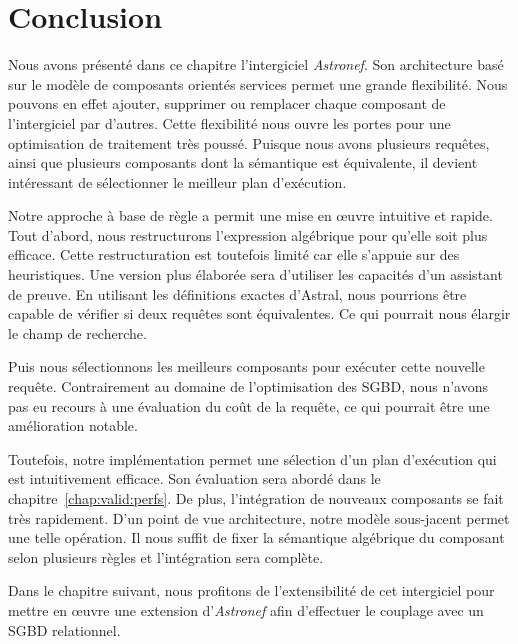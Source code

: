 \section{Conclusion}\label{sec:contrib:astronef:conclusion}
Nous avons présenté dans ce chapitre l'intergiciel \textit{Astronef}. Son architecture basé sur le modèle de composants orientés services permet une grande flexibilité. Nous pouvons en effet ajouter, supprimer ou remplacer chaque composant de l'intergiciel par d'autres. Cette flexibilité nous ouvre les portes pour une optimisation de traitement très poussé. Puisque nous avons plusieurs requêtes, ainsi que plusieurs composants dont la sémantique est équivalente, il devient intéressant de sélectionner le meilleur plan d'exécution.

Notre approche à base de règle a permit une mise en œuvre intuitive et rapide. Tout d'abord, nous restructurons l'expression algébrique pour qu'elle soit plus efficace. Cette restructuration est toutefois limité car elle s'appuie sur des heuristiques. Une version plus élaborée sera d'utiliser les capacités d'un assistant de preuve. En utilisant les définitions exactes d'Astral, nous pourrions être capable de vérifier si deux requêtes sont équivalentes. Ce qui pourrait nous élargir le champ de recherche.

Puis nous sélectionnons les meilleurs composants pour exécuter cette nouvelle requête. Contrairement au domaine de l'optimisation des SGBD, nous n'avons pas eu recours à une évaluation du coût de la requête, ce qui pourrait être une amélioration notable.

Toutefois, notre implémentation permet une sélection d'un plan d'exécution qui est intuitivement efficace. Son évaluation sera abordé dans le chapitre~\ref{chap:valid:perfs}. De plus, l'intégration de nouveaux composants se fait très rapidement. D'un point de vue architecture, notre modèle sous-jacent permet une telle opération. Il nous suffit de fixer la sémantique algébrique du composant selon plusieurs règles et l'intégration sera complète.

Dans le chapitre suivant, nous profitons de l'extensibilité de cet intergiciel pour mettre en œuvre une extension d'\textit{Astronef} afin d'effectuer le couplage avec un SGBD relationnel.